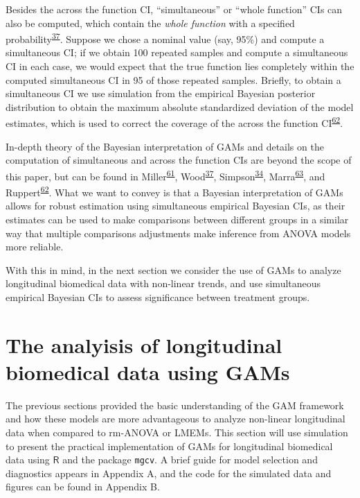\documentclass[
]{article}
\newcommand{\passthrough}[1]{#1}
\begin{document}
Besides the across the function CI, ``simultaneous'' or ``whole function'' CIs can also be computed, which contain the \emph{whole function} with a specified probability\textsuperscript{\protect\hyperlink{ref-wood2017}{37}}. Suppose we chose a nominal value (say, 95\%) and compute a simultaneous CI; if we obtain 100 repeated samples and compute a simultaneous CI in each case, we would expect that the true function lies completely within the computed simultaneous CI in 95 of those repeated samples. Briefly, to obtain a simultaneous CI we use simulation from the empirical Bayesian posterior distribution to obtain the maximum absolute standardized deviation of the model estimates, which is used to correct the coverage of the across the function CI\textsuperscript{\protect\hyperlink{ref-ruppert2003}{62}}.

In-depth theory of the Bayesian interpretation of GAMs and details on the computation of simultaneous and across the function CIs are beyond the scope of this paper, but can be found in Miller\textsuperscript{\protect\hyperlink{ref-miller2019}{61}}, Wood\textsuperscript{\protect\hyperlink{ref-wood2017}{37}}, Simpson\textsuperscript{\protect\hyperlink{ref-simpson2018}{34}}, Marra\textsuperscript{\protect\hyperlink{ref-marra2012}{63}}, and Ruppert\textsuperscript{\protect\hyperlink{ref-ruppert2003}{62}}. What we want to convey is that a Bayesian interpretation of GAMs allows for robust estimation using simultaneous empirical Bayesian CIs, as their estimates can be used to make comparisons between different groups in a similar way that multiple comparisons adjustments make inference from ANOVA models more reliable.

With this in mind, in the next section we consider the use of GAMs to analyze longitudinal biomedical data with non-linear trends, and use simultaneous empirical Bayesian CIs to assess significance between treatment groups.

\hypertarget{longitudinal-GAMs}{%
\section{The analyisis of longitudinal biomedical data using GAMs}\label{longitudinal-GAMs}}

The previous sections provided the basic understanding of the GAM framework and how these models are more advantageous to analyze non-linear longitudinal data when compared to rm-ANOVA or LMEMs. This section will use simulation to present the practical implementation of GAMs for longitudinal biomedical data using \(\textsf{R}\) and the package \passthrough{\lstinline!mgcv!}. A brief guide for model selection and diagnostics appears in Appendix A, and the code for the simulated data and figures can be found in Appendix B.
\end{document}
